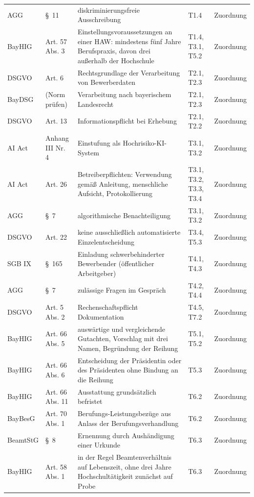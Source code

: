 \begin{small}
\begin{longtable}{@{}>{\raggedright\arraybackslash}p{1.6cm}>{\raggedright\arraybackslash}p{2.6cm}>{\raggedright\arraybackslash}p{5.6cm}>{\raggedright\arraybackslash}p{2.4cm}>{\raggedright\arraybackslash}p{2.0cm}@{}}
AGG & §~11 & diskriminierungsfreie Ausschreibung & T1.4 & Zuordnung \\
BayHIG & Art. 57 Abs. 3 & Einstellungsvoraussetzungen an einer HAW: mindestens fünf Jahre Berufspraxis, davon drei außerhalb der Hochschule & T1.4, T3.1, T5.2 & Zuordnung \\
DSGVO & Art. 6 & Rechtsgrundlage der Verarbeitung von Bewerberdaten & T2.1, T2.3 & Zuordnung \\
BayDSG & (Norm prüfen) & Verarbeitung nach bayerischem Landesrecht & T2.1, T2.3 & Zuordnung \\
DSGVO & Art. 13 & Informationspflicht bei Erhebung & T2.1, T2.2 & Zuordnung \\
AI Act & Anhang III Nr. 4 & Einstufung als Hochrisiko-KI-System & T3.1, T3.2 & Zuordnung \\
AI Act & Art. 26 & Betreiberpflichten: Verwendung gemäß Anleitung, menschliche Aufsicht, Protokollierung & T3.1, T3.2, T3.3, T3.4 & Zuordnung \\
AGG & §~7 & algorithmische Benachteiligung & T3.1, T3.2 & Zuordnung \\
DSGVO & Art. 22 & keine ausschließlich automatisierte Einzelentscheidung & T3.4, T5.3 & Zuordnung \\
SGB IX & §~165 & Einladung schwerbehinderter Bewerbender (öffentlicher Arbeitgeber) & T4.1, T4.3 & Zuordnung \\
AGG & §~7 & zulässige Fragen im Gespräch & T4.2, T4.4 & Zuordnung \\
DSGVO & Art. 5 Abs. 2 & Rechenschaftspflicht Dokumentation & T4.5, T7.2 & Zuordnung \\
BayHIG & Art. 66 Abs. 5 & auswärtige und vergleichende Gutachten, Vorschlag mit drei Namen, Begründung der Reihung & T5.1, T5.2 & Zuordnung \\
BayHIG & Art. 66 Abs. 6 & Entscheidung der Präsidentin oder des Präsidenten ohne Bindung an die Reihung & T5.3 & Zuordnung \\
BayHIG & Art. 66 Abs. 11 & Ausstattung grundsätzlich befristet & T6.2 & Zuordnung \\
BayBesG & Art. 70 Abs. 1 & Berufungs-Leistungsbezüge aus Anlass der Berufungsverhandlung & T6.2 & Zuordnung \\
BeamtStG & §~8 & Ernennung durch Aushändigung einer Urkunde & T6.3 & Zuordnung \\
BayHIG & Art. 58 Abs. 1 & in der Regel Beamtenverhältnis auf Lebenszeit, ohne drei Jahre Hochschultätigkeit zunächst auf Probe & T6.3 & Zuordnung \\

\end{longtable}
\end{small}

